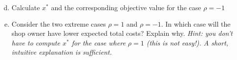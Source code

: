 \documentclass[assignments]{subfiles}
\begin{document}
\begin{exercise}
\begin{enumerate}[(a)]
    \setcounter{enumi}{3}
    \item Calculate $x^*$ and the corresponding objective value for the case $\rho = -1$
    \item Consider the two extreme cases $\rho = 1$ and $\rho = -1$. In which case will the shop owner have lower expected total costs? Explain why. \textit{Hint: you don't have to compute $x^*$ for the case where $\rho = 1$ (this is not easy!). A short, intuitive explanation is sufficient.}
\end{enumerate}


\end{exercise}
\end{document}
